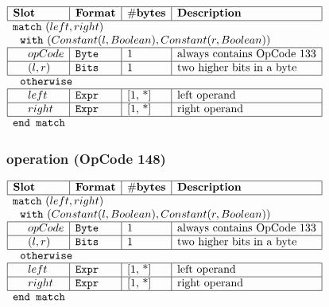 \noindent
\(\begin{array}{| l | l | l | l |}
    \hline
    \bf{Slot} & \bf{Format} & \bf{\#bytes} & \bf{Description} \\
    \hline
        \multicolumn{4}{l}{\lst{match}~(left, right)} \\
         
    \multicolumn{4}{l}{~~\lst{with}~(Constant(l, Boolean), Constant(r, Boolean)) } \\
    \hline
            ~~~~ opCode & \lst{Byte} & \text{1} & \text{always contains OpCode 133} \\
    \hline
          ~~~~ (l,r) & \lst{Bits} & \text{1} & \text{two higher bits in a byte} \\
    \hline
      
    \multicolumn{4}{l}{~~\lst{otherwise} } \\
    \hline
            ~~~~ left & \lst{Expr} & \text{[1, *]} & \text{left operand} \\
    \hline
          ~~~~ right & \lst{Expr} & \text{[1, *]} & \text{right operand} \\
    \hline
          \multicolumn{4}{l}{\lst{end match}} \\
\end{array}\)
       

\subsubsection{ operation (OpCode 148)}

\noindent
\(\begin{array}{| l | l | l | l |}
    \hline
    \bf{Slot} & \bf{Format} & \bf{\#bytes} & \bf{Description} \\
    \hline
        \multicolumn{4}{l}{\lst{match}~(left, right)} \\
         
    \multicolumn{4}{l}{~~\lst{with}~(Constant(l, Boolean), Constant(r, Boolean)) } \\
    \hline
            ~~~~ opCode & \lst{Byte} & \text{1} & \text{always contains OpCode 133} \\
    \hline
          ~~~~ (l,r) & \lst{Bits} & \text{1} & \text{two higher bits in a byte} \\
    \hline
      
    \multicolumn{4}{l}{~~\lst{otherwise} } \\
    \hline
            ~~~~ left & \lst{Expr} & \text{[1, *]} & \text{left operand} \\
    \hline
          ~~~~ right & \lst{Expr} & \text{[1, *]} & \text{right operand} \\
    \hline
          \multicolumn{4}{l}{\lst{end match}} \\
\end{array}\)
       

